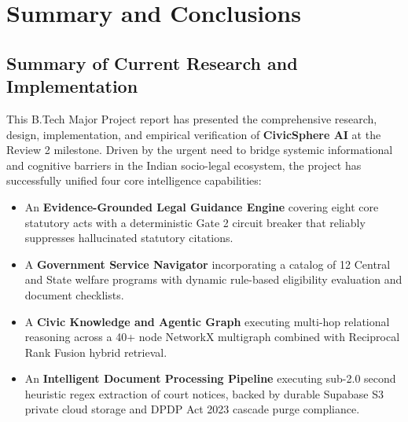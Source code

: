 \chapter{Summary and Conclusions}
\label{ch:conclusions}

\section{Summary of Current Research and Implementation}
\label{sec:conclusion_summary}
This B.Tech Major Project report has presented the comprehensive research, design, implementation, and empirical verification of \textbf{CivicSphere AI} at the Review 2 milestone. Driven by the urgent need to bridge systemic informational and cognitive barriers in the Indian socio-legal ecosystem, the project has successfully unified four core intelligence capabilities:
\begin{itemize}
    \item An \textbf{Evidence-Grounded Legal Guidance Engine} covering eight core statutory acts with a deterministic Gate 2 circuit breaker that reliably suppresses hallucinated statutory citations.
    \item A \textbf{Government Service Navigator} incorporating a catalog of 12 Central and State welfare programs with dynamic rule-based eligibility evaluation and document checklists.
    \item A \textbf{Civic Knowledge and Agentic Graph} executing multi-hop relational reasoning across a 40+ node NetworkX multigraph combined with Reciprocal Rank Fusion hybrid retrieval.
    \item An \textbf{Intelligent Document Processing Pipeline} executing sub-2.0 second heuristic regex extraction of court notices, backed by durable Supabase S3 private cloud storage and DPDP Act 2023 cascade purge compliance.
\end{itemize}

